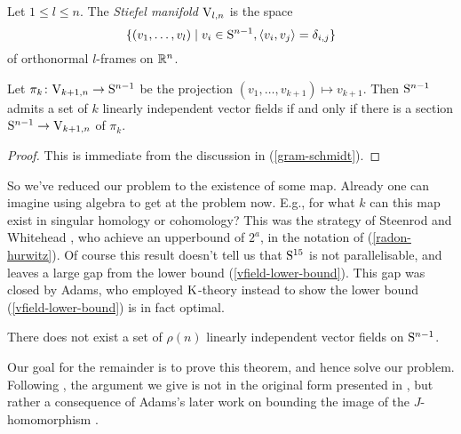 \begin{definition}
  \label{stiefel}
  Let $1 \le l \le n$. The \emph{Stiefel manifold} $\V_{l,n}$ is the
  space
  \[
  \{(v_1,\ldots,v_l) \mid v_i \in \S^{n-1}, \langle v_i, v_j \rangle =
  \delta_{i,j}\}
  \]
  of orthonormal $l$-frames on $\R^n$.
\end{definition}

\begin{lemma}
  Let $\pi_k \c \V_{k+1,n} \to \S^{n-1}$ be the projection
  $(v_1,\ldots,v_{k+1}) \mapsto v_{k+1}$. Then $\S^{n-1}$ admits a set
  of $k$ linearly independent vector fields if and only if there is a
  section $\S^{n-1} \to \V_{k+1,n}$ of $\pi_k$.
\end{lemma}

\begin{proof}
  This is immediate from the discussion in (\ref{gram-schmidt}).
\end{proof}

So we've reduced our problem to the existence of some map. Already one
can imagine using algebra to get at the problem now. E.g., for what
$k$ can this map exist in singular homology or cohomology?  This was
the strategy of Steenrod and Whitehead \cite{steenrod-vfields}, who
achieve an upperbound of $2^a$, in the notation of
(\ref{radon-hurwitz}). Of course this result doesn't tell us that
$\S^{15}$ is not parallelisable, and leaves a large gap from the lower
bound (\ref{vfield-lower-bound}). This gap was closed by Adams, who
employed $\K$-theory instead to show the lower bound
(\ref{vfield-lower-bound}) is in fact optimal.

\begin{theorem}
  \label{vfield-upper-bound}
  There does not exist a set of $\rho(n)$ linearly independent vector
  fields on $\S^{n-1}$.
\end{theorem}

Our goal for the remainder is to prove this theorem, and hence solve
our problem. Following \cite{miller-vfields}, the argument we give is
not in the original form presented in \cite{adams-vfields}, but rather
a consequence of Adams's later work on bounding the image of the
$J$-homomorphism \cite{adams-J-II}.






